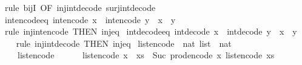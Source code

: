 \begin{isabellebody}
\isatagproof
{}\isamarkupfalse%
\ {\isacharparenleft}rule\ bijI\ {\isacharbrackleft}OF\ inj{\isacharunderscore}int{\isacharunderscore}decode\ surj{\isacharunderscore}int{\isacharunderscore}decode{\isacharbrackright}{\isacharparenright}%
\endisatagproof
{\isafoldproof}%
%
\isadelimproof
\isanewline
%
\endisadelimproof
\isanewline
{}\isamarkupfalse%
\ int{\isacharunderscore}encode{\isacharunderscore}eq{\isacharcolon}\ {\isachardoublequoteopen}int{\isacharunderscore}encode\ x\ {\isacharequal}\ int{\isacharunderscore}encode\ y\ {\isasymlongleftrightarrow}\ x\ {\isacharequal}\ y{\isachardoublequoteclose}\isanewline
%
\isadelimproof
\ \ %
\endisadelimproof
%
\isatagproof
{}\isamarkupfalse%
\ {\isacharparenleft}rule\ inj{\isacharunderscore}int{\isacharunderscore}encode\ {\isacharbrackleft}THEN\ inj{\isacharunderscore}eq{\isacharbrackright}{\isacharparenright}%
\endisatagproof
{\isafoldproof}%
%
\isadelimproof
\isanewline
%
\endisadelimproof
\isanewline
{}\isamarkupfalse%
\ int{\isacharunderscore}decode{\isacharunderscore}eq{\isacharcolon}\ {\isachardoublequoteopen}int{\isacharunderscore}decode\ x\ {\isacharequal}\ int{\isacharunderscore}decode\ y\ {\isasymlongleftrightarrow}\ x\ {\isacharequal}\ y{\isachardoublequoteclose}\isanewline
%
\isadelimproof
\ \ %
\endisadelimproof
%
\isatagproof
{}\isamarkupfalse%
\ {\isacharparenleft}rule\ inj{\isacharunderscore}int{\isacharunderscore}decode\ {\isacharbrackleft}THEN\ inj{\isacharunderscore}eq{\isacharbrackright}{\isacharparenright}%
\endisatagproof
{\isafoldproof}%
%
\isadelimproof
%
\endisadelimproof
%
\isadelimdocument
%
\endisadelimdocument
%
\isatagdocument
%
\isamarkuptrue%
%
\endisatagdocument
{\isafolddocument}%
%
\isadelimdocument
%
\endisadelimdocument
{}\isamarkupfalse%
\ list{\isacharunderscore}encode\ {\isacharcolon}{\isacharcolon}\ {\isachardoublequoteopen}nat\ list\ {\isasymRightarrow}\ nat{\isachardoublequoteclose}\isanewline
\ \ \isanewline
\ \ \ \ {\isachardoublequoteopen}list{\isacharunderscore}encode\ {\isacharbrackleft}{\isacharbrackright}\ {\isacharequal}\ {}{\isachardoublequoteclose}\isanewline
\ \ {\isacharbar}\ {\isachardoublequoteopen}list{\isacharunderscore}encode\ {\isacharparenleft}x\ {\isacharhash}\ xs{\isacharparenright}\ {\isacharequal}\ Suc\ {\isacharparenleft}prod{\isacharunderscore}encode\ {\isacharparenleft}x{\isacharcomma}\ list{\isacharunderscore}encode\ xs{\isacharparenright}{\isacharparenright}{\isachardoublequoteclose}\isanewline

\end{isabellebody}
